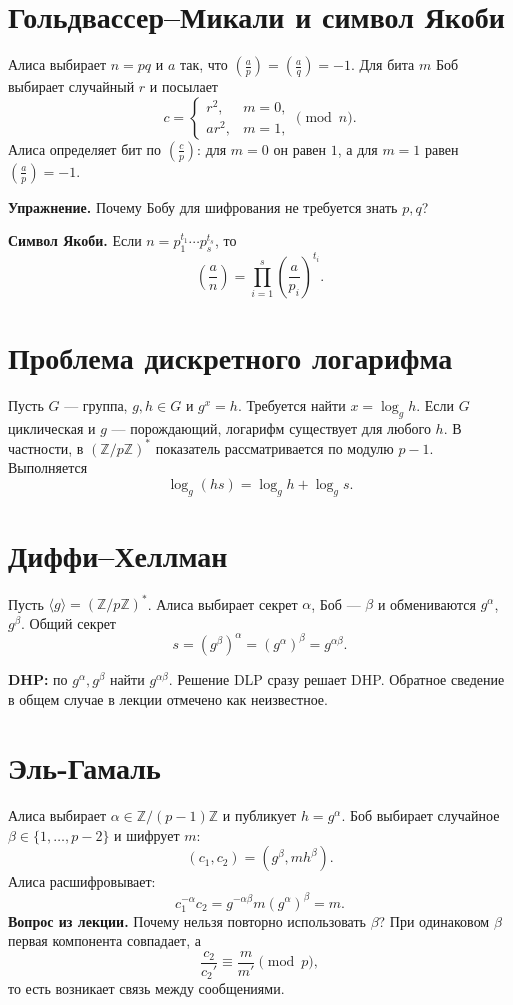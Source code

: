 \documentclass[12pt,a4paper]{article}
\newcommand{\Z}{\mathbb Z}\newcommand{\F}{\mathbb F}\DeclareMathOperator{\ord}{ord}
\begin{document}
\section{Гольдвассер--Микали и символ Якоби}
Алиса выбирает $n=pq$ и $a$ так, что $\left(\frac ap\right)=\left(\frac aq\right)=-1$. Для бита $m$ Боб выбирает случайный $r$ и посылает
\[c=\begin{cases}r^2,&m=0,\\ ar^2,&m=1,\end{cases}\pmod n.\]
Алиса определяет бит по $\left(\frac cp\right)$: для $m=0$ он равен $1$, а для $m=1$ равен $\left(\frac ap\right)=-1$.

\textbf{Упражнение.} Почему Бобу для шифрования не требуется знать $p,q$?

\textbf{Символ Якоби.} Если $n=p_1^{t_1}\cdots p_s^{t_s}$, то
\[\left(\frac an\right)=\prod_{i=1}^s\left(\frac{a}{p_i}\right)^{t_i}.\]

\section{Проблема дискретного логарифма}
Пусть $G$ --- группа, $g,h\in G$ и $g^x=h$. Требуется найти $x=\log_g h$. Если $G$ циклическая и $g$ --- порождающий, логарифм существует для любого $h$. В частности, в $(\Z/p\Z)^*$ показатель рассматривается по модулю $p-1$. Выполняется
\[\log_g(hs)=\log_g h+\log_g s.\]

\section{Диффи--Хеллман}
Пусть $\langle g\rangle=(\Z/p\Z)^*$. Алиса выбирает секрет $\alpha$, Боб --- $\beta$ и обмениваются $g^\alpha$, $g^\beta$. Общий секрет
\[s=(g^\beta)^\alpha=(g^\alpha)^\beta=g^{\alpha\beta}.\]
\begin{center}\end{center}
\textbf{DHP:} по $g^\alpha,g^\beta$ найти $g^{\alpha\beta}$. Решение DLP сразу решает DHP. Обратное сведение в общем случае в лекции отмечено как неизвестное.

\section{Эль-Гамаль}
Алиса выбирает $\alpha\in\Z/(p-1)\Z$ и публикует $h=g^\alpha$. Боб выбирает случайное $\beta\in\{1,\ldots,p-2\}$ и шифрует $m$:
\[(c_1,c_2)=(g^\beta,mh^\beta).\]
Алиса расшифровывает:
\[c_1^{-\alpha}c_2=g^{-\alpha\beta}m(g^\alpha)^\beta=m.\]
\textbf{Вопрос из лекции.} Почему нельзя повторно использовать $\beta$? При одинаковом $\beta$ первая компонента совпадает, а
\[\frac{c_2}{c_2'}\equiv\frac{m}{m'}\pmod p,\]
то есть возникает связь между сообщениями.
\end{document}
